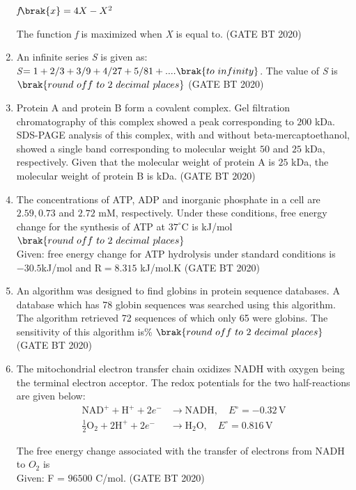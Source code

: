 \documentclass[journal,12pt,onecolumn]{IEEEtran}
\theoremstyle{remark}
\begin{document}
\begin{enumerate}[label=Q\arabic*:, start=26, leftmargin=2em]
\begin{center}
$\textit{f}\brak{x}= 4X - X^2$
\end{center}
The function \textit{f} is maximized when \textit{X} is equal to. \hfill(GATE BT 2020)\\

\item An infinite series \textit{S} is given as:\\
\textit{S}$=1+ 2/3 + 3/9 + 4/27 + 5/81 +....\brak{to \ infinity}$. 
The value of \textit{S} is\\ $\brak{round \ off \ to \ 2 \ decimal\ places}$ \hfill(GATE BT 2020)\\

\item Protein A and protein B form a covalent complex. Gel filtration chromatography of this complex showed a peak corresponding to $200$ kDa. SDS-PAGE analysis of this complex, with and without beta-mercaptoethanol, showed a single band corresponding to molecular weight $50$ and $25$ kDa, respectively. Given that the molecular weight of protein A is $25$ kDa, the molecular weight of protein B is  kDa. \hfill(GATE BT 2020)\\

\item The concentrations of ATP, ADP and inorganic phosphate in a cell are $2.59, 0.73$ and $2.72$ mM, respectively. Under these conditions, free energy change for the synthesis of ATP at $37^{\circ}\mathrm{C}$ is kJ/mol$\brak{round \ off \ to \ 2 \ decimal\ places}$\\
Given: free energy change for ATP hydrolysis under standard conditions is $-30.5$kJ/mol and R$ = 8.315$ kJ/mol.K \hfill(GATE BT 2020)

\item An algorithm was designed to find globins in protein sequence databases. A database which has 78 globin sequences was searched using this algorithm. The algorithm retrieved 72 sequences of which only 65 were globins. The sensitivity of this algorithm is\%  $\brak{round \ off \ to \ 2 \ decimal\ places}$ \hfill(GATE BT 2020)\\

\item The mitochondrial electron transfer chain oxidizes NADH with oxygen being the terminal electron acceptor. The redox potentials for the two half-reactions are given below:\\

\begin{align*}
\text{NAD}^+ + \text{H}^+ + 2e^- &\rightarrow \text{NADH}, \quad E^\circ = -0.32\, \text{V} \\
\frac{1}{2}\text{O}_2 + 2\text{H}^+ + 2e^- &\rightarrow \text{H}_2\text{O}, \quad E^\circ = 0.816\, \text{V}
\end{align*}

The free energy change associated with the transfer of electrons from NADH to $O_{2}$ is 
\\Given: F = $96500$ C/mol. \hfill(GATE BT 2020)
\end{enumerate}
\end{document}
